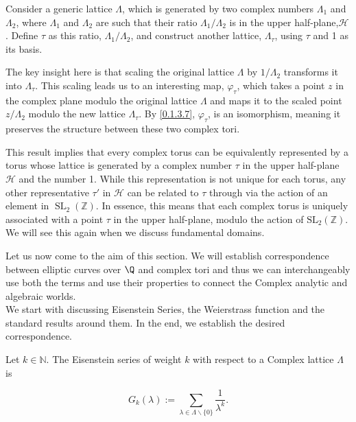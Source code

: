 \begin{remark}

Consider a generic lattice \( \Lambda \), which is generated by two complex numbers \( \Lambda_{1} \) and \( \Lambda_{2} \), where \( \Lambda_{1} \) and \( \Lambda_{2} \) are such that their ratio \( \Lambda_{1} / \Lambda_{2} \) is in the upper half-plane,\( \mathcal{H} \). Define \( \tau \) as this ratio, \( \Lambda_{1} / \Lambda_{2} \), and construct another lattice, \( \Lambda_{\tau} \), using \( \tau \) and 1 as its basis.

The key insight here is that scaling the original lattice \( \Lambda \) by \( 1/\Lambda_{2} \) transforms it into \( \Lambda_{\tau} \). This scaling leads us to an interesting map, \( \varphi_{\tau} \), which takes a point \( z \) in the complex plane modulo the original lattice \( \Lambda \) and maps it to the scaled point \( z/\Lambda_{2} \) modulo the new lattice \( \Lambda_{\tau} \). By \ref{0.1.3.7}, \( \varphi_{\tau} \), is an isomorphism, meaning it preserves the structure between these two complex tori.

This result implies that every complex torus can be equivalently represented by a torus whose lattice is generated by a complex number \( \tau \) in the upper half-plane \( \mathcal{H} \) and the number 1. While this representation is not unique for each torus, any other representative \( \tau' \) in \( \mathcal{H} \) can be related to \( \tau \) through via the action of an element in \( \operatorname{SL}_{2}(\mathbb{Z}) \). In essence, this means that each complex torus is uniquely associated with a point \( \tau \) in the upper half-plane, modulo the action of \( \mathrm{SL}_{2}(\mathbb{Z}) \). We will see this again when we discuss fundamental domains. 
\end{remark}
\vspace{1cm}
Let us now come to the aim of this section. We will establish correspondence between elliptic curves over $\Q$ and complex tori and thus we can interchangeably use both the terms and use their properties to connect the Complex analytic and algebraic worlds. \\

We start with discussing Eisenstein Series, the Weierstrass function and the standard results around them. 
In the end, we establish the desired correspondence.

\begin{definition}

Let $k \in \mathbb{N}$. The Eisenstein series of weight $k$ with respect to a Complex lattice $\Lambda$ is

$$
G_{k}(\lambda):=\sum_{\lambda \in \Lambda \backslash\{0\}} \frac{1}{\lambda^{k}} .
$$
    
\end{definition}


